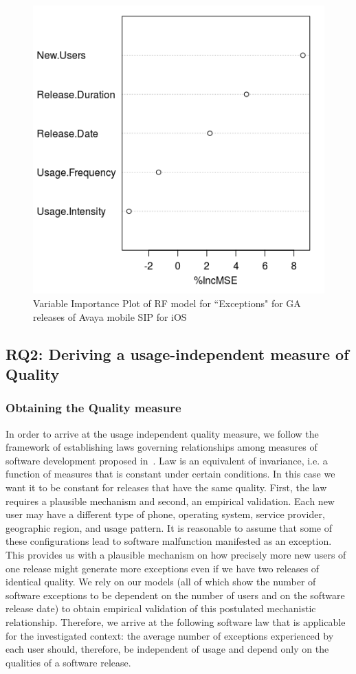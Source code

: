 \documentclass[smallcondensed]{svjour3}     %
\begin{document}
\begin{figure}[!t]
\centering
\includegraphics[width=0.4\linewidth]{rfI}%
\caption{Variable Importance Plot of RF model for ``Exceptions" for GA releases of Avaya mobile SIP for iOS}
\label{fig:rfI}
\vspace{-10pt}
\end{figure}

\subsection{RQ2: Deriving a usage-independent measure of Quality}\label{s:qual}

\subsubsection{Obtaining the Quality measure}
In order to arrive at the usage independent quality measure, we follow the framework of establishing laws governing relationships among measures of software development proposed in~\cite{mockuskeynote}. Law is an equivalent of invariance, i.e. a function of measures that is constant under certain conditions. In this case we want it to be constant for releases that have the same quality. First, the law requires a plausible mechanism and second, an empirical validation. Each new user may have a different type of phone, operating system, service provider, geographic region, and usage pattern. It is reasonable to assume that some of these configurations lead to software malfunction manifested as an exception. This provides us with a plausible mechanism on how precisely more new users of one release might generate more exceptions even if we have two releases of identical quality. 
We rely on our models (all of which show the number of software 
exceptions to be dependent on the number of users and on the software release date) to obtain empirical validation of this postulated mechanistic relationship. Therefore,
we arrive at the following software law that is applicable for the investigated context: the average number of 
exceptions experienced by each user should, therefore, be independent of usage and depend only on the qualities of a software release.
\end{document}
